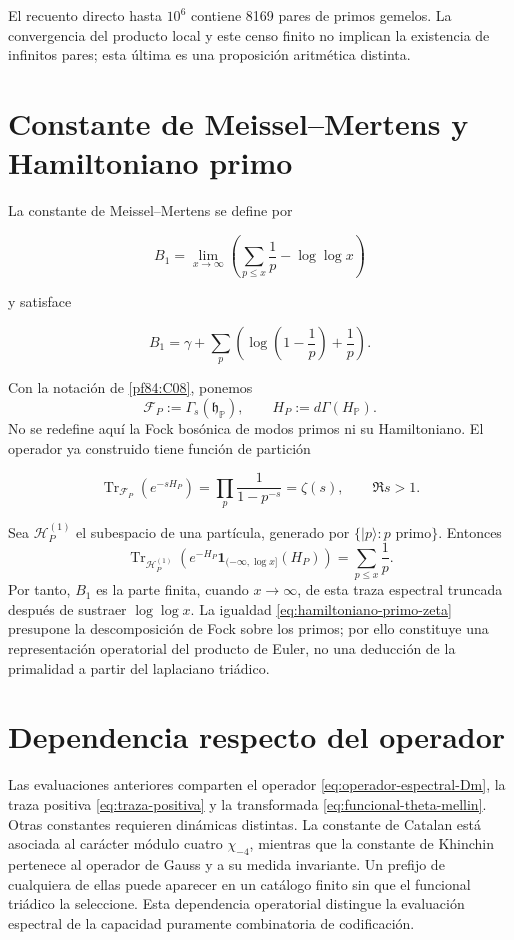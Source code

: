 El recuento directo hasta $10^6$ contiene 8169 pares de primos gemelos. La
convergencia del producto local y este censo finito no implican la
existencia de infinitos pares; esta última es una proposición aritmética
distinta.

\section{Constante de Meissel--Mertens y Hamiltoniano primo}

La constante de Meissel--Mertens se define por

\begin{equation}
 B_1=\lim_{x\to\infty}
 \left(\sum_{p\leq x}\frac1p-\log\log x\right)
 \label{eq:meissel-mertens-def}
\end{equation}

y satisface

\begin{equation}
 B_1=\gamma+
 \sum_p\left(\log\!\left(1-\frac1p\right)+\frac1p\right).
 \label{eq:meissel-mertens-euler}
\end{equation}

Con la notación de \cref{pf84:C08}, ponemos
\[
 \mathcal F_P:=\Gamma_s(\mathfrak h_{\mathbb P}),
 \qquad
 H_P:=d\Gamma(H_{\mathbb P}).
\]
No se redefine aquí la Fock bosónica de modos primos ni su Hamiltoniano. El
operador ya construido tiene función de partición

\begin{equation}
 \operatorname{Tr}_{\mathcal F_P}(e^{-sH_P})
 =\prod_p\frac1{1-p^{-s}}
 =\zeta(s),
 \qquad \Re s>1.
 \label{eq:hamiltoniano-primo-zeta}
\end{equation}

Sea \(\mathcal H_P^{(1)}\) el subespacio de una partícula, generado por
\(\{|p\rangle:p\text{ primo}\}\). Entonces
\[
 \operatorname{Tr}_{\mathcal H_P^{(1)}}\!\left(
 e^{-H_P}\mathbf 1_{(-\infty,\log x]}(H_P)\right)
 =\sum_{p\leq x}\frac1p.
\]
Por tanto, \(B_1\) es la parte finita, cuando \(x\to\infty\), de esta traza
espectral truncada después de sustraer \(\log\log x\). La igualdad
\eqref{eq:hamiltoniano-primo-zeta} presupone la descomposición de Fock sobre
los primos; por ello constituye una representación operatorial del producto
de Euler, no una deducción de la primalidad a partir del laplaciano
triádico.

\section{Dependencia respecto del operador}

Las evaluaciones anteriores comparten el operador
\eqref{eq:operador-espectral-Dm}, la traza positiva
\eqref{eq:traza-positiva} y la transformada
\eqref{eq:funcional-theta-mellin}. Otras constantes requieren dinámicas
distintas. La constante de Catalan está asociada al carácter módulo cuatro
$\chi_{-4}$, mientras que la constante de Khinchin pertenece al operador de
Gauss y a su medida invariante. Un prefijo de cualquiera de ellas puede
aparecer en un catálogo finito sin que el funcional triádico la seleccione.
Esta dependencia operatorial distingue la evaluación espectral de la
capacidad puramente combinatoria de codificación.
